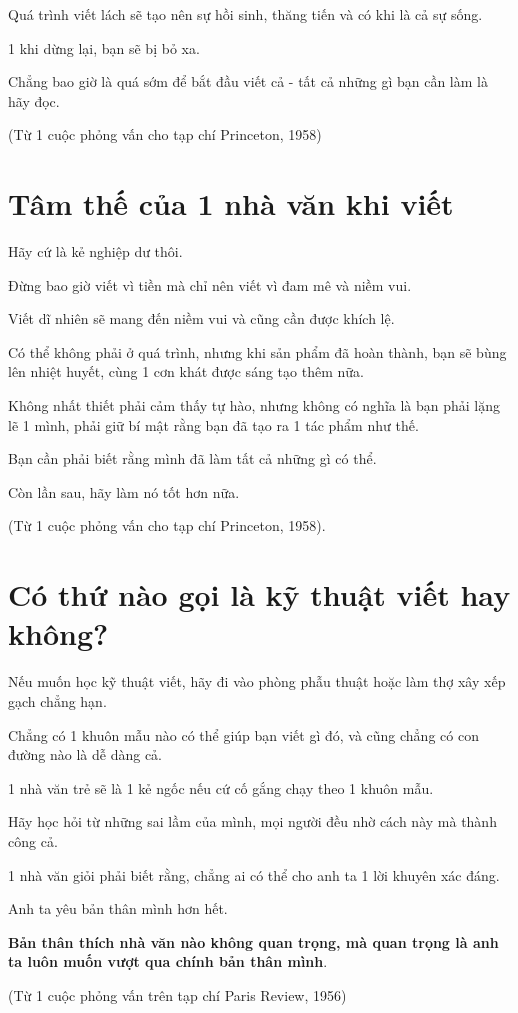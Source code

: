 \documentclass{book}
\numberwithin{equation}{section}
\begin{document}
Quá trình viết lách sẽ tạo nên sự hồi sinh, thăng tiến và có khi là cả sự sống.

1 khi dừng lại, bạn sẽ bị bỏ xa.

Chẳng bao giờ là quá sớm để bắt đầu viết cả - tất cả những gì bạn cần làm là hãy đọc.

(Từ 1 cuộc phỏng vấn cho tạp chí Princeton, 1958)

\section{Tâm thế của 1 nhà văn khi viết}
Hãy cứ là kẻ nghiệp dư thôi.

Đừng bao giờ viết vì tiền mà chỉ nên viết vì đam mê và niềm vui.

Viết dĩ nhiên sẽ mang đến niềm vui và cũng cần được khích lệ.

Có thể không phải ở quá trình, nhưng khi sản phẩm đã hoàn thành, bạn sẽ bùng lên nhiệt huyết, cùng 1 cơn khát được sáng tạo thêm nữa.

Không nhất thiết phải cảm thấy tự hào, nhưng không có nghĩa là bạn phải lặng lẽ 1 mình, phải giữ bí mật rằng bạn đã tạo ra 1 tác phẩm như thế.

Bạn cần phải biết rằng mình đã làm tất cả những gì có thể.

Còn lần sau, hãy làm nó tốt hơn nữa.

(Từ 1 cuộc phỏng vấn cho tạp chí Princeton, 1958).

\section{Có thứ nào gọi là kỹ thuật viết hay không?}
Nếu muốn học kỹ thuật viết, hãy đi vào phòng phẫu thuật hoặc làm thợ xây xếp gạch chẳng hạn.

Chẳng có 1 khuôn mẫu nào có thể giúp bạn viết gì đó, và cũng chẳng có con đường nào là dễ dàng cả.

1 nhà văn trẻ sẽ là 1 kẻ ngốc nếu cứ cố gắng chạy theo 1 khuôn mẫu.

Hãy học hỏi từ những sai lầm của mình, mọi người đều nhờ cách này mà thành công cả.

1 nhà văn giỏi phải biết rằng, chẳng ai có thể cho anh ta 1 lời khuyên xác đáng.

Anh ta yêu bản thân mình hơn hết.

\textbf{Bản thân thích nhà văn nào không quan trọng, mà quan trọng là anh ta luôn muốn vượt qua chính bản thân mình}.

(Từ 1 cuộc phỏng vấn trên tạp chí Paris Review, 1956)
\end{document}
